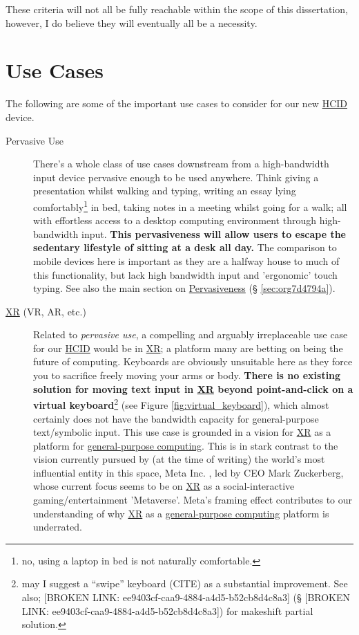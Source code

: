 \documentclass[logo,bsc,singlespacing,parskip]{infthesis}
\begin{document}
These criteria will not all be fully reachable within the scope of this dissertation, however, I do believe they will eventually all be a necessity.

\chapter{Use Cases}
\label{sec:orga05133e}
The following are some of the important use cases to consider for our new \hyperref[org917851e]{HCID} device.

\begin{description}
\item[{Pervasive Use}] There's a whole class of use cases downstream from a high-bandwidth input device pervasive enough to be used anywhere.
Think giving a presentation whilst walking and typing, writing an essay lying comfortably\footnote{no, using a laptop in bed is not naturally comfortable.} in bed, taking notes in a meeting whilst going for a walk; all with effortless access to a desktop computing environment through high-bandwidth input.
\textbf{This pervasiveness will allow users to escape the sedentary lifestyle of sitting at a desk all day.}
The comparison to mobile devices here is important as they are a halfway house to much of this functionality, but lack high bandwidth input and 'ergonomic' touch typing.
See also the main section on \hyperref[sec:org7d4794a]{Pervasiveness} (§ \ref{sec:org7d4794a}).

\item[{\hyperref[org53dbe83]{XR} (VR, AR, etc.)}] Related to \emph{pervasive use}, a compelling and arguably irreplaceable use case for our \hyperref[org917851e]{HCID} would be in \hyperref[org53dbe83]{XR}; a platform many are betting on being the future of computing.
Keyboards are obviously unsuitable here as they force you to sacrifice freely moving your arms or body.
\textbf{There is no existing solution for moving text input in \hyperref[org53dbe83]{XR} beyond point-and-click on a virtual keyboard}\footnote{may I suggest a ``swipe'' keyboard (CITE) as a substantial improvement. See also; [BROKEN LINK: ee9403cf-caa9-4884-a4d5-b52cb8d4c8a3] (§ [BROKEN LINK: ee9403cf-caa9-4884-a4d5-b52cb8d4c8a3]) for makeshift partial solution.} (see Figure \ref{fig:virtual_keyboard}), which almost certainly does not have the bandwidth capacity for general-purpose text/symbolic input.
This use case is grounded in a vision for \hyperref[org53dbe83]{XR} as a platform for \hyperref[org2840555]{general-purpose computing}.
This is in stark contrast to the vision currently pursued by (at the time of writing) the world's most influential entity in this space, Meta Inc. \autocite{WelcomeMetaMeta}, led by CEO Mark Zuckerberg, whose current focus seems to be on \hyperref[org53dbe83]{XR} as a social-interactive gaming/entertainment 'Metaverse'.
Meta's framing effect contributes to our understanding of why \hyperref[org53dbe83]{XR} as a \hyperref[org2840555]{general-purpose computing} platform is underrated.


\end{description}
\end{document}
